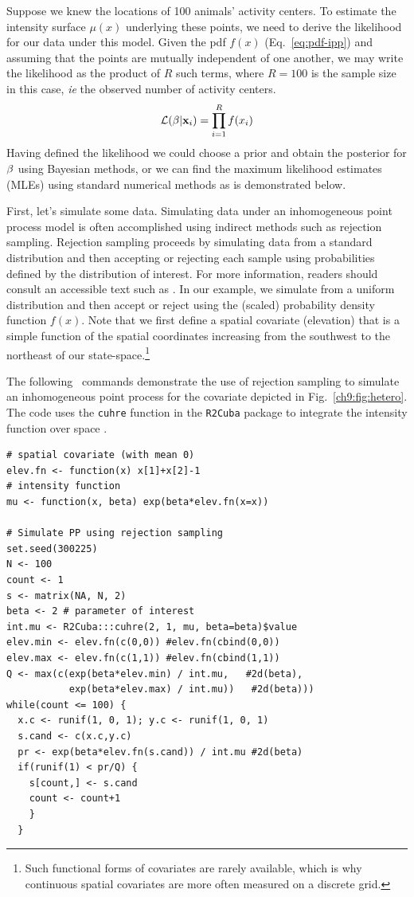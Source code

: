 Suppose we knew the locations of 100 animals' activity
centers. To estimate the intensity surface $\mu(x)$ underlying these points, we
need to derive the likelihood for our data under this model. Given the
pdf $f(x)$ (Eq.~\ref{eq:pdf-ipp}) and assuming that the points are
mutually independent of one another, we may write
the likelihood as the product
of $R$ such terms, where $R=100$ is the sample size in this case,
\emph{ie} the observed number of activity centers.
\[
\mathcal{L}({\bf \beta} | {\bf x}_i) = \prod_{i=1}^R f(x_i)
\]
Having defined the likelihood we could choose a prior and obtain the posterior for
$\bf \beta$ using Bayesian methods, or we can find the maximum likelihood
estimates (MLEs) using standard numerical methods as is demonstrated
below.

First, let's simulate some data. Simulating data under an inhomogeneous point process model is often
accomplished using indirect methods such as rejection
sampling. Rejection sampling proceeds by
simulating data from a standard distribution and then accepting or
rejecting each sample using probabilities defined by the distribution
of interest. For more information, readers should consult an
accessible text such as \citet{robert_casella:2004}. In our example, we
simulate from a uniform distribution and then accept or reject using
the (scaled) probability density function $f(x)$. Note that we first define a
spatial covariate (elevation) that is a simple function of the spatial
coordinates increasing from the southwest to the northeast of our
state-space.\footnote{Such functional forms of
covariates are rarely available, which is why continuous spatial
covariates are more often measured on a discrete grid.}

The following \R~commands demonstrate the use of rejection sampling to
simulate an inhomogeneous point process for the covariate depicted in
Fig.~\ref{ch9:fig:hetero}. The code uses the \verb+cuhre+ function in
the {\tt R2Cuba} package to integrate the intensity function over
space \citep{hahn_etal:2011}.

\begin{small}
\begin{verbatim}
# spatial covariate (with mean 0)
elev.fn <- function(x) x[1]+x[2]-1
# intensity function
mu <- function(x, beta) exp(beta*elev.fn(x=x))

# Simulate PP using rejection sampling
set.seed(300225)
N <- 100
count <- 1
s <- matrix(NA, N, 2)
beta <- 2 # parameter of interest
int.mu <- R2Cuba:::cuhre(2, 1, mu, beta=beta)$value
elev.min <- elev.fn(c(0,0)) #elev.fn(cbind(0,0))
elev.max <- elev.fn(c(1,1)) #elev.fn(cbind(1,1))
Q <- max(c(exp(beta*elev.min) / int.mu,   #2d(beta),
           exp(beta*elev.max) / int.mu))   #2d(beta)))
while(count <= 100) {
  x.c <- runif(1, 0, 1); y.c <- runif(1, 0, 1)
  s.cand <- c(x.c,y.c)
  pr <- exp(beta*elev.fn(s.cand)) / int.mu #2d(beta)
  if(runif(1) < pr/Q) {
    s[count,] <- s.cand
    count <- count+1
    }
  }
\end{verbatim}
\end{small}


